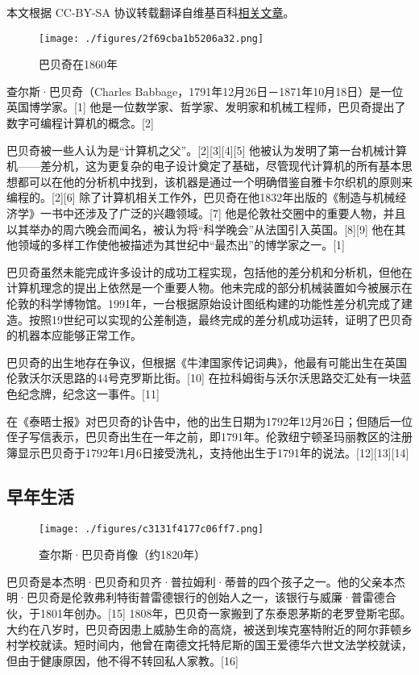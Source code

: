 
本文根据 CC-BY-SA 协议转载翻译自维基百科\href{https://en.wikipedia.org/wiki/Charles_Babbage}{相关文章}。

\begin{figure}[ht]
\centering
\texttt{[image: ./figures/2f69cba1b5206a32.png]}
\caption{巴贝奇在1860年} \label{fig_CRSBQ_1}
\end{figure}
查尔斯·巴贝奇（Charles Babbage，1791年12月26日－1871年10月18日）是一位英国博学家。[1] 他是一位数学家、哲学家、发明家和机械工程师，巴贝奇提出了数字可编程计算机的概念。[2]

巴贝奇被一些人认为是“计算机之父”。[2][3][4][5] 他被认为发明了第一台机械计算机——差分机，这为更复杂的电子设计奠定了基础，尽管现代计算机的所有基本思想都可以在他的分析机中找到，该机器是通过一个明确借鉴自雅卡尔织机的原则来编程的。[2][6] 除了计算机相关工作外，巴贝奇在他1832年出版的《制造与机械经济学》一书中还涉及了广泛的兴趣领域。[7] 他是伦敦社交圈中的重要人物，并且以其举办的周六晚会而闻名，被认为将“科学晚会”从法国引入英国。[8][9] 他在其他领域的多样工作使他被描述为其世纪中“最杰出”的博学家之一。[1]

巴贝奇虽然未能完成许多设计的成功工程实现，包括他的差分机和分析机，但他在计算机理念的提出上依然是一个重要人物。他未完成的部分机械装置如今被展示在伦敦的科学博物馆。1991年，一台根据原始设计图纸构建的功能性差分机完成了建造。按照19世纪可以实现的公差制造，最终完成的差分机成功运转，证明了巴贝奇的机器本应能够正常工作。


巴贝奇的出生地存在争议，但根据《牛津国家传记词典》，他最有可能出生在英国伦敦沃尔沃思路的44号克罗斯比街。[10] 在拉科姆街与沃尔沃思路交汇处有一块蓝色纪念牌，纪念这一事件。[11]

在《泰晤士报》对巴贝奇的讣告中，他的出生日期为1792年12月26日；但随后一位侄子写信表示，巴贝奇出生在一年之前，即1791年。伦敦纽宁顿圣玛丽教区的注册簿显示巴贝奇于1792年1月6日接受洗礼，支持他出生于1791年的说法。[12][13][14]
\subsection{早年生活}
\begin{figure}[ht]
\centering
\texttt{[image: ./figures/c3131f4177c06ff7.png]}
\caption{查尔斯·巴贝奇肖像（约1820年）} \label{fig_CRSBQ_9}
\end{figure}
巴贝奇是本杰明·巴贝奇和贝齐·普拉姆利·蒂普的四个孩子之一。他的父亲本杰明·巴贝奇是伦敦弗利特街普雷德银行的创始人之一，该银行与威廉·普雷德合伙，于1801年创办。[15] 1808年，巴贝奇一家搬到了东泰恩茅斯的老罗登斯宅邸。大约在八岁时，巴贝奇因患上威胁生命的高烧，被送到埃克塞特附近的阿尔菲顿乡村学校就读。短时间内，他曾在南德文托特尼斯的国王爱德华六世文法学校就读，但由于健康原因，他不得不转回私人家教。[16]

